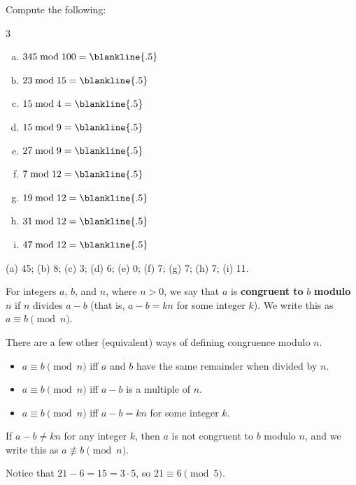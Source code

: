 \begin{exer} Compute the following: \\[-.45in]
\begin{multicols}{3}
\begin{enumerate}[(a)]
\item
$345 \bmod 100 = \blankline{.5}$
\item
$23 \bmod 15 = \blankline{.5}$
\item
$15 \bmod 4 = \blankline{.5}$
\item
$ 15 \bmod 9 = \blankline{.5}$
\item
$ 27 \bmod 9 = \blankline{.5}$
\item
$ 7\bmod 12 = \blankline{.5}$
\item
$19\bmod 12 = \blankline{.5} $
\item
$31\bmod 12 = \blankline{.5}$
\item
$47\bmod 12 = \blankline{.5}$
\end{enumerate}
\end{multicols}
\begin{answer}
(a) 45; (b) 8; (c) 3; (d) 6; (e) 0; (f) 7; (g) 7; (h) 7; (i) 11.
\end{answer}
\end{exer}

\begin{df}\label{df:congr}
For integers $a$, $b$, and $n$, where $n>0$,
we say that $a$ is {\bf congruent to } $b$ {\bf modulo $n$} if
$n$ divides $a-b$ (that is, $a-b=kn$ for some integer $k$). 
We write this as $a\equiv b\pmod n$.

There are a few other (equivalent) ways of defining congruence modulo $n$.
\begin{itemize}
\item
$a\equiv b\pmod n$ iff $a$ and $b$ have the same remainder when divided by $n$.
\item
$a\equiv b \pmod n$ iff $a-b$ is a multiple of $n$.
\item
$a\equiv b \pmod n$ iff $a-b=kn$ for some integer $k$.
\end{itemize}

\noindent
If $a-b\neq kn$ for any integer $k$, then $a$ is not congruent to $b$ modulo  $n$, 
and we write this as $a\not \equiv b \pmod n$.
\end{df}

\begin{exa}
Notice that $21-6 = 15 = 3\cdot 5$, so $21\equiv 6 \pmod 5$.
\end{exa}

